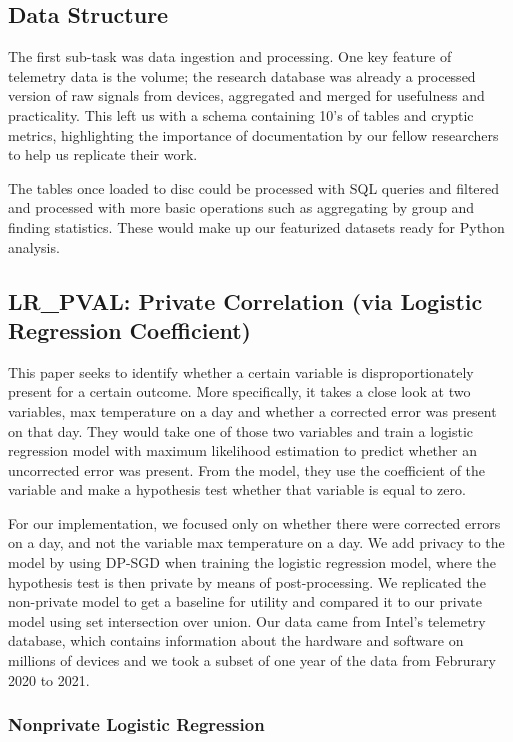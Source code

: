 \documentclass[12pt,letterpaper]{article}
\begin{document}
\subsection{Data Structure}

The first sub-task was data ingestion and processing. One key feature of telemetry data is the volume; the research database was already a processed version of raw signals from devices, aggregated and merged for usefulness and practicality. This left us with a schema containing 10's of tables and cryptic metrics, highlighting the importance of documentation by our fellow researchers to help us replicate their work.

The tables once loaded to disc could be processed with SQL queries and filtered and processed with more basic operations such as aggregating by group and finding statistics. These would make up our featurized datasets ready for Python analysis.

\subsection{LR\_PVAL: Private Correlation (via Logistic Regression Coefficient)}

This paper\cite{prodhealLR} seeks to identify whether a certain variable is disproportionately present for a certain outcome. 
More specifically, it takes a close look at two variables, max temperature on a day and whether a corrected error was present on that day. 
They would take one of those two variables and train a logistic regression model with maximum likelihood estimation to predict whether an uncorrected error was present.
From the model, they use the coefficient of the variable and make a hypothesis test whether that variable is equal to zero.

For our implementation, we focused only on whether there were corrected errors on a day, and not the variable max temperature on a day.
We add privacy to the model by using DP-SGD when training the logistic regression model, where the hypothesis test is then private by means of post-processing.
We replicated the non-private model to get a baseline for utility and compared it to our private model using set intersection over union.
Our data came from Intel's telemetry database, which contains information about the hardware and software on millions of devices
and we took a subset of one year of the data from Februrary 2020 to 2021.

\subsubsection{Nonprivate Logistic Regression}
\end{document}
